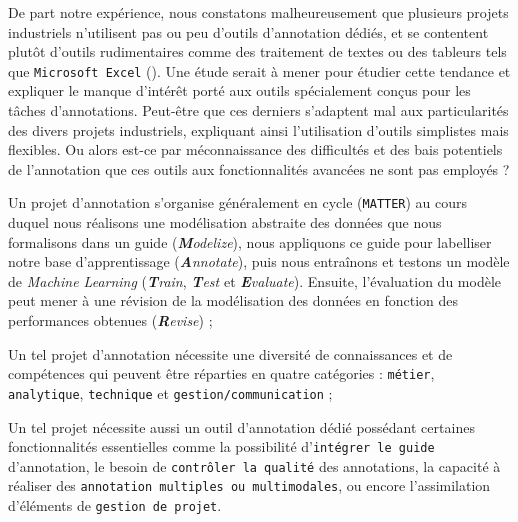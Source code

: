 		\begin{leftBarAuthorOpinion}
			De part notre expérience, nous constatons malheureusement que plusieurs projets industriels n'utilisent pas ou peu d'outils d'annotation dédiés, et se contentent plutôt d'outils rudimentaires comme des traitement de textes ou des tableurs tels que \texttt{Microsoft Excel} (\cite{microsoft-corporation:2018:microsoft-excel}).
			Une étude serait à mener pour étudier cette tendance et expliquer le manque d'intérêt porté aux outils spécialement conçus pour les tâches d'annotations.
			Peut-être que ces derniers s'adaptent mal aux particularités des divers projets industriels, expliquant ainsi l'utilisation d'outils simplistes mais flexibles. Ou alors est-ce par méconnaissance des difficultés et des bais potentiels de l'annotation que ces outils aux fonctionnalités avancées ne sont pas employés ?
		\end{leftBarAuthorOpinion}
	
	\begin{leftBarSummary}
		\begin{todolist}
			\item[\itemok] Un projet d'annotation s'organise généralement en cycle (\texttt{MATTER}) au cours duquel nous réalisons une modélisation abstraite des données que nous formalisons dans un guide (\textit{\textbf{M}odelize}), nous appliquons ce guide pour labelliser notre base d'apprentissage (\textit{\textbf{A}nnotate}), puis nous entraînons et testons un modèle de \textit{Machine Learning} (\textit{\textbf{T}rain}, \textit{\textbf{T}est} et \textit{\textbf{E}valuate}). Ensuite, l'évaluation du modèle peut mener à une révision de la modélisation des données en fonction des performances obtenues (\textit{\textbf{R}evise}) ;
			\item[\itemok] Un tel projet d'annotation nécessite une diversité de connaissances et de compétences qui peuvent être réparties en quatre catégories : \texttt{métier}, \texttt{analytique}, \texttt{technique} et \texttt{gestion/communication} ;
			\item[\itemok] Un tel projet nécessite aussi un outil d'annotation dédié possédant certaines fonctionnalités essentielles comme la possibilité d'\texttt{intégrer le guide} d'annotation, le besoin de \texttt{contrôler la qualité} des annotations, la capacité à réaliser des \texttt{annotation multiples ou multimodales}, ou encore l'assimilation d'éléments de \texttt{gestion de projet}.
		\end{todolist}
	\end{leftBarSummary}
